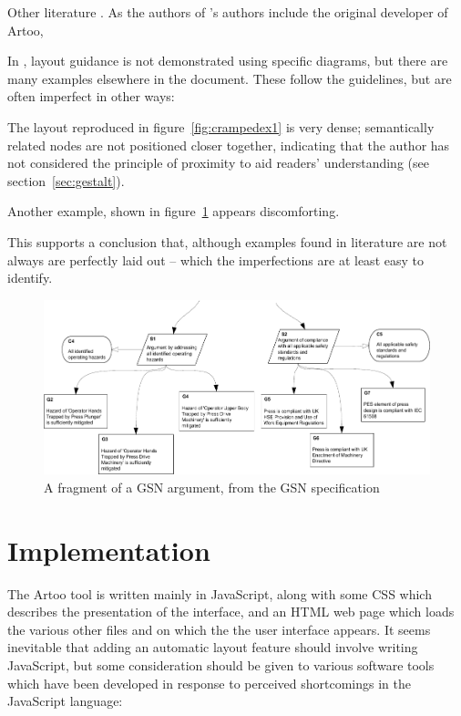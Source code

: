 Other literature  . As the authors of \cite{royal}'s authors include the original developer of Artoo, 

In \cite{gsnstandard}, layout guidance is not demonstrated using specific diagrams, but there are many examples elsewhere in the document. These follow the guidelines, but are often imperfect in other ways:

\begin{itemize*}
    \item The layout reproduced in figure~\ref{fig:crampedex1} is very dense; semantically related nodes are not positioned closer together, indicating that the author has not considered the principle of proximity to aid readers' understanding (see section~\ref{sec:gestalt}).
    \item Another example, shown in figure~\ref{fig:unalignedsiblings} appears discomforting. 
\end{itemize*}

This supports a conclusion that, although examples found in literature are not always are perfectly laid out -- which  the imperfections are at least easy to identify.

\begin{figure}
    \includegraphics[width=\textwidth]{graphics/unaligned_siblings.pdf}
    \caption{A fragment of a GSN argument,
            from the GSN specification \citep[figure~42, section~2.3.6.5, pp.~34]{gsnstandard}}
    \label{fig:unalignedsiblings}
\end{figure}




\section{Implementation}

The Artoo tool is written mainly in JavaScript, along with some CSS which describes the presentation of the interface, and an HTML web page which loads the various other files and on which the the user interface appears. It seems inevitable that adding an automatic layout feature should involve writing JavaScript, but some consideration should be given to various software tools which have been developed in response to perceived shortcomings in the JavaScript language:

